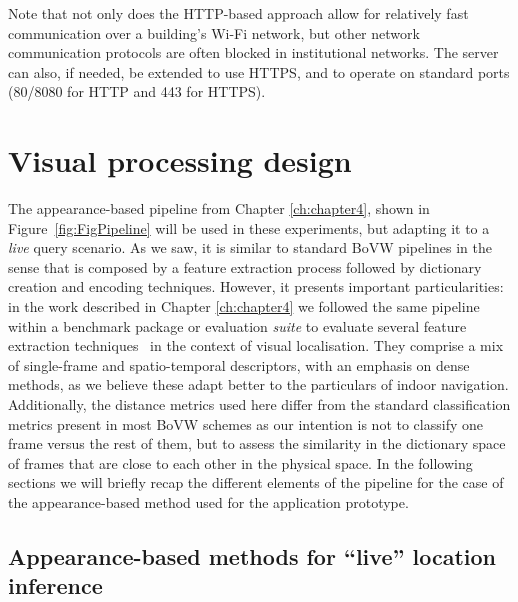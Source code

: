 Note that not only does the HTTP-based approach allow for relatively fast communication over a building's Wi-Fi network, but other network communication protocols are often blocked in institutional networks. The server can also, if needed, be extended to use HTTPS, and to operate on standard ports (80/8080 for HTTP and 443 for HTTPS).

\section{Visual processing design}
\label{sec:visualproc}
The appearance-based pipeline from Chapter \ref{ch:chapter4}, shown in Figure~\ref{fig:FigPipeline} will be used in these experiments, but adapting it to a \emph{live} query scenario. As we saw, it is similar to standard BoVW pipelines in the sense that is composed by a feature extraction process followed by dictionary creation and encoding techniques. However, it presents important particularities: in the work described in Chapter \ref{ch:chapter4} we followed the same pipeline within a benchmark package or evaluation \emph{suite} to evaluate several feature extraction techniques~\citep{Rivera-Rubio2015PRL} in the context of visual localisation. They comprise a mix of single-frame and spatio-temporal descriptors, with an emphasis on dense methods, as we believe these adapt better to the particulars of indoor navigation. Additionally, the distance metrics used here differ from the standard classification metrics present in most BoVW schemes as our intention is not to classify one frame versus the rest of them, but to assess the similarity in the dictionary space of frames that are close to each other in the physical space. In the following sections we will briefly recap the different elements of the pipeline for the case of the appearance-based method used for the application prototype.

\subsection{Appearance-based methods for ``live'' location inference}

